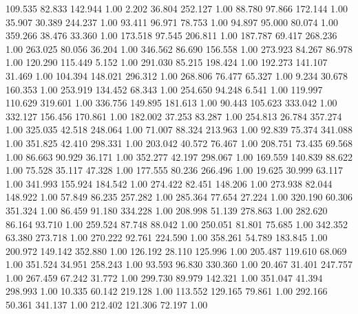  109.535   82.833  142.944         1.00
   2.202   36.804  252.127         1.00
  88.780   97.866  172.144         1.00
  35.907   30.389  244.237         1.00
  93.411   96.971   78.753         1.00
  94.897   95.000   80.074         1.00
 359.266   38.476   33.360         1.00
 173.518   97.545  206.811         1.00
 187.787   69.417  268.236         1.00
 263.025   80.056   36.204         1.00
 346.562   86.690  156.558         1.00
 273.923   84.267   86.978         1.00
 120.290  115.449    5.152         1.00
 291.030   85.215  198.424         1.00
 192.273  141.107   31.469         1.00
 104.394  148.021  296.312         1.00
 268.806   76.477   65.327         1.00
   9.234   30.678  160.353         1.00
 253.919  134.452   68.343         1.00
 254.650   94.248    6.541         1.00
 119.997  110.629  319.601         1.00
 336.756  149.895  181.613         1.00
  90.443  105.623  333.042         1.00
 332.127  156.456  170.861         1.00
 182.002   37.253   83.287         1.00
 254.813   26.784  357.274         1.00
 325.035   42.518  248.064         1.00
  71.007   88.324  213.963         1.00
  92.839   75.374  341.088         1.00
 351.825   42.410  298.331         1.00
 203.042   40.572   76.467         1.00
 208.751   73.435   69.568         1.00
  86.663   90.929   36.171         1.00
 352.277   42.197  298.067         1.00
 169.559  140.839   88.622         1.00
  75.528   35.117   47.328         1.00
 177.555   80.236  266.496         1.00
  19.625   30.999   63.117         1.00
 341.993  155.924  184.542         1.00
 274.422   82.451  148.206         1.00
 273.938   82.044  148.922         1.00
  57.849   86.235  257.282         1.00
 285.364   77.654   27.224         1.00
 320.190   60.306  351.324         1.00
  86.459   91.180  334.228         1.00
 208.998   51.139  278.863         1.00
 282.620   86.164   93.710         1.00
 259.524   87.748   88.042         1.00
 250.051   81.801   75.685         1.00
 342.352   63.380  273.718         1.00
 270.222   92.761  224.590         1.00
 358.261   54.789  183.845         1.00
 200.972  149.142  352.880         1.00
 126.192   28.110  125.996         1.00
 205.487  119.610   68.069         1.00
 351.524   34.951  258.243         1.00
  93.593   96.830  330.360         1.00
  20.467   31.401  247.757         1.00
 267.459   67.242   31.772         1.00
 299.730   89.979  142.321         1.00
 351.047   41.394  298.993         1.00
  10.335   60.142  219.128         1.00
 113.552  129.165   79.861         1.00
 292.166   50.361  341.137         1.00
 212.402  121.306   72.197         1.00
